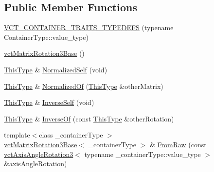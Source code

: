 \subsection*{Public Member Functions}
\begin{DoxyCompactItemize}
\item 
\hyperlink{classvct_matrix_rotation3_base_a81f2ff9ba837b0b062fdcafb9a8fcdfc}{V\+C\+T\+\_\+\+C\+O\+N\+T\+A\+I\+N\+E\+R\+\_\+\+T\+R\+A\+I\+T\+S\+\_\+\+T\+Y\+P\+E\+D\+E\+F\+S} (typename Container\+Type\+::value\+\_\+type)
\item 
\hyperlink{classvct_matrix_rotation3_base_a38b1463ff78213b73bc2b861e2011c86}{vct\+Matrix\+Rotation3\+Base} ()
\item 
\hyperlink{classvct_matrix_rotation3_base_a027be766cb10ca3c2ad8e85c28ed0af9}{This\+Type} \& \hyperlink{classvct_matrix_rotation3_base_a13c2e22df6afe87cbe9c61375913d82e}{Normalized\+Self} (void)
\item 
\hyperlink{classvct_matrix_rotation3_base_a027be766cb10ca3c2ad8e85c28ed0af9}{This\+Type} \& \hyperlink{classvct_matrix_rotation3_base_abd6eeb56b507792f9fb8421827ea3dcd}{Normalized\+Of} (\hyperlink{classvct_matrix_rotation3_base_a027be766cb10ca3c2ad8e85c28ed0af9}{This\+Type} \&other\+Matrix)
\item 
\hyperlink{classvct_matrix_rotation3_base_a027be766cb10ca3c2ad8e85c28ed0af9}{This\+Type} \& \hyperlink{classvct_matrix_rotation3_base_af8390b4abcbcb6f7f64dd6b53d4a7e01}{Inverse\+Self} (void)
\item 
\hyperlink{classvct_matrix_rotation3_base_a027be766cb10ca3c2ad8e85c28ed0af9}{This\+Type} \& \hyperlink{classvct_matrix_rotation3_base_a33574e4e0b99cb0925ffd12776d2b907}{Inverse\+Of} (const \hyperlink{classvct_matrix_rotation3_base_a027be766cb10ca3c2ad8e85c28ed0af9}{This\+Type} \&other\+Rotation)
\item 
{\footnotesize template$<$class \+\_\+container\+Type $>$ }\\\hyperlink{classvct_matrix_rotation3_base}{vct\+Matrix\+Rotation3\+Base}$<$ \+\_\+container\+Type $>$ \& \hyperlink{classvct_matrix_rotation3_base_a1bfb155585ea99b14ae5543e4b5ae928}{From\+Raw} (const \hyperlink{classvct_axis_angle_rotation3}{vct\+Axis\+Angle\+Rotation3}$<$ typename \+\_\+container\+Type\+::value\+\_\+type $>$ \&axis\+Angle\+Rotation)
\end{DoxyCompactItemize}
